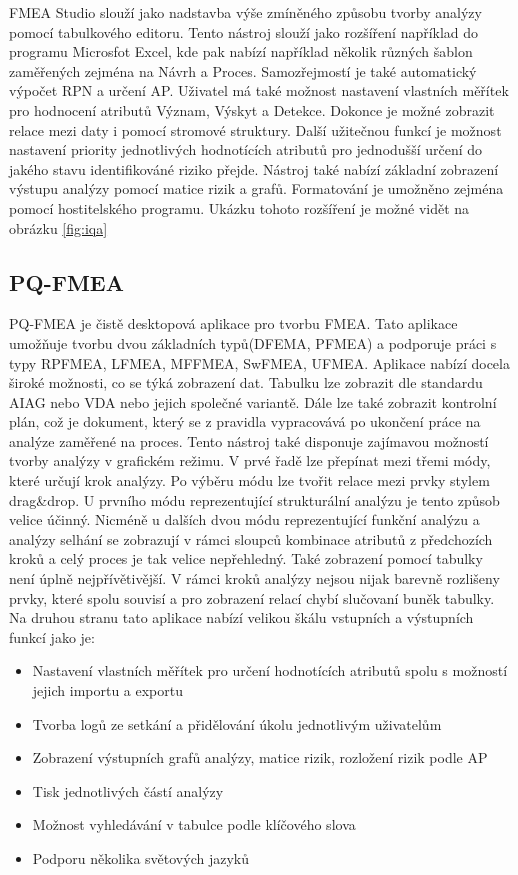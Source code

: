 \cite{fmeaStudio}FMEA Studio slouží jako nadstavba výše zmíněného způsobu tvorby analýzy pomocí tabulkového editoru. Tento nástroj slouží jako rozšíření například do programu Microsfot Excel, kde pak nabízí například několik různých šablon zaměřených zejména na Návrh a Proces. Samozřejmostí je také automatický výpočet RPN a určení AP. Uživatel má také možnost nastavení vlastních měřítek pro hodnocení atributů Význam, Výskyt a Detekce. Dokonce je možné zobrazit relace mezi daty i pomocí stromové struktury. Další užitečnou funkcí je možnost nastavení priority jednotlivých hodnotících atributů pro jednodušší určení do jakého stavu identifikováné riziko přejde. Nástroj také nabízí základní zobrazení výstupu analýzy pomocí matice rizik a grafů. Formatování je umožněno zejména pomocí hostitelského programu. Ukázku tohoto rozšíření je možné vidět na obrázku \ref{fig:iqa}
\break
\break


\subsection{PQ-FMEA}
\cite{pqFMEA}PQ-FMEA je čistě desktopová aplikace pro tvorbu FMEA. Tato aplikace umožňuje tvorbu dvou základních typů(DFEMA, PFMEA) a podporuje práci s typy RPFMEA, LFMEA, MFFMEA, SwFMEA, UFMEA. Aplikace nabízí docela široké možnosti, co se týká zobrazení dat. Tabulku lze zobrazit dle standardu AIAG nebo VDA nebo jejich společné variantě. Dále lze také zobrazit kontrolní plán, což je dokument, který se z pravidla vypracovává po ukončení práce na analýze zaměřené na proces. Tento nástroj také disponuje zajímavou možností tvorby analýzy v grafickém režimu. V prvé řadě lze přepínat mezi třemi módy, které určují krok analýzy. Po výběru módu lze tvořit relace mezi prvky stylem drag\&drop. U prvního módu reprezentující strukturální analýzu je tento způsob velice účinný. Nicméně u dalších dvou módu reprezentující funkční analýzu a analýzy selhání se zobrazují v rámci sloupců kombinace atributů z předchozích kroků a celý proces je tak velice nepřehledný. Také zobrazení pomocí tabulky není úplně nejpřívětivější. V rámci kroků analýzy nejsou nijak barevně rozlišeny prvky, které spolu souvisí a pro zobrazení relací chybí slučovaní buněk tabulky. Na druhou stranu tato aplikace nabízí velikou škálu vstupních a výstupních funkcí jako je:
\begin{itemize}
    \item Nastavení vlastních měřítek pro určení hodnotících atributů spolu s možností jejich importu a exportu
    \item Tvorba logů ze setkání a přidělování úkolu jednotlivým uživatelům
    \item Zobrazení výstupních grafů analýzy, matice rizik, rozložení rizik podle AP 
    \item Tisk jednotlivých částí analýzy
    \item Možnost vyhledávání v tabulce podle klíčového slova
    \item Podporu několika světových jazyků
\end{itemize}

